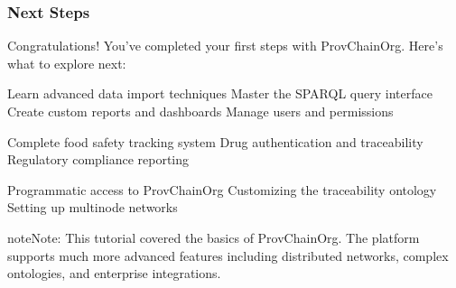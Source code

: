 \documentclass[letterpaper,10pt,english]{sphinxmanual}
\begin{document}
\subsubsection{Next Steps}
\label{\detokenize{user-guide/first-steps:next-steps}}
\sphinxAtStartPar
Congratulations! You’ve completed your first steps with ProvChainOrg. Here’s what to explore next:

\sphinxAtStartPar
{}
\sphinxhyphen{}  \sphinxhyphen{} Learn advanced data import techniques
\sphinxhyphen{}  \sphinxhyphen{} Master the SPARQL query interface
\sphinxhyphen{}  \sphinxhyphen{} Create custom reports and dashboards
\sphinxhyphen{}  \sphinxhyphen{} Manage users and permissions

\sphinxAtStartPar
{}
\sphinxhyphen{}  \sphinxhyphen{} Complete food safety tracking system
\sphinxhyphen{}  \sphinxhyphen{} Drug authentication and traceability
\sphinxhyphen{}  \sphinxhyphen{} Regulatory compliance reporting

\sphinxAtStartPar
{}
\sphinxhyphen{}  \sphinxhyphen{} Programmatic access to ProvChainOrg
\sphinxhyphen{}  \sphinxhyphen{} Customizing the traceability ontology
\sphinxhyphen{}  \sphinxhyphen{} Setting up multi\sphinxhyphen{}node networks

\begin{sphinxadmonition}{note}{Note:}
\sphinxAtStartPar
This tutorial covered the basics of ProvChainOrg. The platform supports much more advanced features including distributed networks, complex ontologies, and enterprise integrations.
\end{sphinxadmonition}
\end{document}
